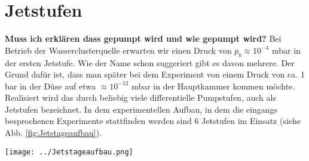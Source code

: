 \section{Jetstufen}

\textbf{Muss ich erklären dass gepumpt wird und wie gepumpt wird?}
Bei Betrieb der Wasserclusterquelle erwarten wir einen Druck von $p_b \approx 10^{-4}$ mbar in der ersten Jetstufe. Wie der Name schon suggeriert gibt es davon mehrere. Der Grund dafür ist, dass man später bei dem Experiment von einem Druck von ca. 1 bar in der Düse auf etwa $\approx 10^{-12}$ mbar in der Hauptkammer kommen möchte. Realisiert wird das durch beliebig viele differentielle Pumpstufen, auch als Jetstufen bezeichnet. In dem experimentellen Aufbau, in dem die eingangs besprochenen Experimente stattfinden werden sind 6 Jetstufen im Einsatz (siehe Abb. \ref{fig:Jetstageaufbau}).

\begin{center}
\begin{minipage}{\linewidth}
\centering
\texttt{[image: ../Jetstageaufbau.png]}%
 \label{fig:Jetstageaufbau}
\end{minipage} 
\end{center} 

